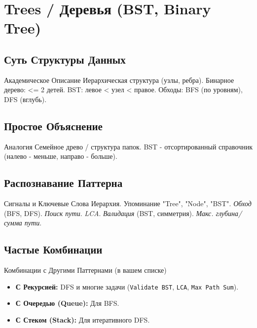 \section{Trees / Деревья (BST, Binary Tree)}

\subsection{Суть Структуры Данных}
\begin{myblock}{Академическое Описание}
    Иерархическая структура (узлы, ребра). Бинарное дерево: <= 2 детей. BST: левое < узел < правое. Обходы: BFS (по уровням), DFS (вглубь).
\end{myblock}

\subsection{Простое Объяснение}
\begin{myblock}{Аналогия}
    Семейное древо / структура папок. BST - отсортированный справочник (налево - меньше, направо - больше).
\end{myblock}

\subsection{Распознавание Паттерна}
\begin{myblock}{Сигналы и Ключевые Слова}
    Иерархия. Упоминание "Tree", "Node", "BST". \emph{Обход} (BFS, DFS). \emph{Поиск пути}. \emph{LCA}. \emph{Валидация} (BST, симметрия). \emph{Макс. глубина/сумма пути}.
\end{myblock}

\subsection{Частые Комбинации}
\begin{myblock}{Комбинации с Другими Паттернами (в вашем списке)}
    \begin{itemize}[nosep, leftmargin=*]
        \item \textbf{С Рекурсией:} DFS и многие задачи (\texttt{Validate BST}, \texttt{LCA}, \texttt{Max Path Sum}).
        \item \textbf{С Очередью (Queue):} Для BFS.
        \item \textbf{С Стеком (Stack):} Для итеративного DFS.
    \end{itemize}
\end{myblock}

